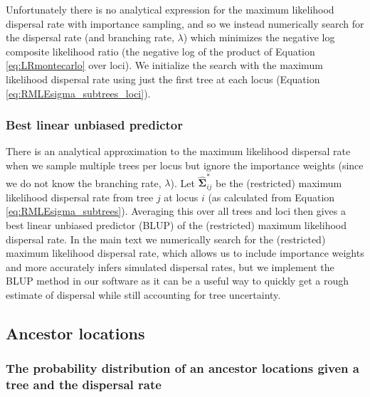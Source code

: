 \documentclass[12pt]{article}
\begin{document}
Unfortunately there is no analytical expression for the maximum likelihood dispersal rate with importance sampling, and so we instead numerically search for the dispersal rate (and branching rate, $\lambda$) which minimizes the negative log composite likelihood ratio (the negative log of the product of Equation \eqref{eq:LRmontecarlo} over loci).
We initialize the search with the maximum likelihood dispersal rate using just the first tree at each locus (Equation \ref{eq:RMLEsigma_subtrees_loci}).

\subsubsection*{Best linear unbiased predictor}

There is an analytical approximation to the maximum likelihood dispersal rate when we sample multiple trees per locus but ignore the importance weights (since we do not know the branching rate, $\lambda$).
Let $\widehat{\mathbf{\Sigma}}^*_{ij}$ be the (restricted) maximum likelihood dispersal rate from tree $j$ at locus $i$ (as calculated from Equation \ref{eq:RMLEsigma_subtrees}).
Averaging this over all trees and loci then gives a best linear unbiased predictor (BLUP) of the (restricted) maximum likelihood dispersal rate.
In the main text we numerically search for the (restricted) maximum likelihood dispersal rate, which allows us to include importance weights and more accurately infers simulated dispersal rates, but we implement the BLUP method in our software as it can be a useful way to quickly get a rough estimate of dispersal while still accounting for tree uncertainty.

\subsection*{Ancestor locations}

\subsubsection*{The probability distribution of an ancestor locations given a tree and the dispersal rate}
\end{document}
